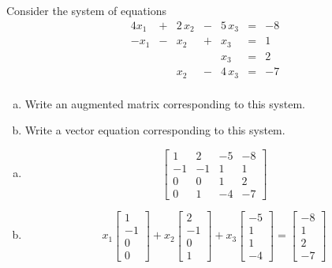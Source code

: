 
\begin{exerciseStatement}


 Consider the system of equations 
\begin{alignat*}{4} x_{1} &+& 2 \, x_{2} &-& 5 \, x_{3} &=& -8 \\-x_{1} &-& x_{2} &+& x_{3} &=& 1 \\ & &  & & x_{3} &=& 2 \\ & & x_{2} &-& 4 \, x_{3} &=& -7 \\ \end{alignat*}
            


\begin{enumerate}[(a)]
\item  Write an augmented matrix corresponding to this system. 
\item  Write a vector equation corresponding to this system. 
\end{enumerate}
    
\end{exerciseStatement}
    
\begin{exerciseAnswer} 

\begin{enumerate}[(a)]
\item \[ \left[\begin{array}{ccc|c}
1 & 2 & -5 & -8 \\
-1 & -1 & 1 & 1 \\
0 & 0 & 1 & 2 \\
0 & 1 & -4 & -7
\end{array}\right] \]
\item \[ x_{1} \left[\begin{array}{c}
1 \\
-1 \\
0 \\
0
\end{array}\right] + x_{2} \left[\begin{array}{c}
2 \\
-1 \\
0 \\
1
\end{array}\right] + x_{3} \left[\begin{array}{c}
-5 \\
1 \\
1 \\
-4
\end{array}\right] = \left[\begin{array}{c}
-8 \\
1 \\
2 \\
-7
\end{array}\right] \]
\end{enumerate}
    
\end{exerciseAnswer}
    
